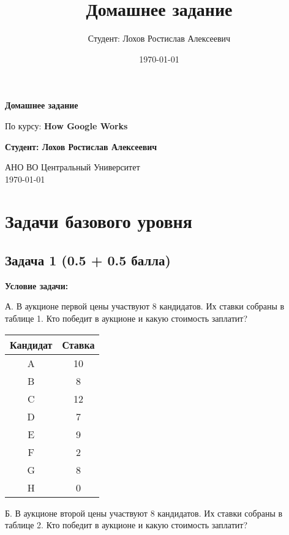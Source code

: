 \documentclass[a4paper,12pt]{article}
\title{Домашнее задание}
\author{Студент: Лохов Ростислав Алексеевич}
\date{\today}
\begin{document}
\begin{titlepage}
    \centering
    \vspace*{1cm}

    \Huge
    \textbf{Домашнее задание}

    \vspace{0.5cm}
    \LARGE
    По курсу: \textbf{How Google Works}

    \vspace{1.5cm}

    \textbf{Студент: Лохов Ростислав Алексеевич}

    \vfill

    \Large
    АНО ВО Центральный Университет\\
    \vspace{0.3cm}
    \today

\end{titlepage}

\tableofcontents
\newpage

\section{Задачи базового уровня}

\subsection{Задача 1 (0.5 + 0.5 балла)}
\textbf{Условие задачи:}

А. В аукционе первой цены участвуют 8 кандидатов. Их ставки собраны в таблице 1. Кто победит в аукционе и какую стоимость заплатит?

\begin{center}
\begin{tabular}{|c|c|}
\hline
Кандидат & Ставка \\
\hline
A & 10 \\
B & 8 \\
C & 12 \\
D & 7 \\
E & 9 \\
F & 2 \\
G & 8 \\
H & 0 \\
\hline
\end{tabular}
\end{center}

Б. В аукционе второй цены участвуют 8 кандидатов. Их ставки собраны в таблице 2. Кто победит в аукционе и какую стоимость заплатит?
\end{document}
